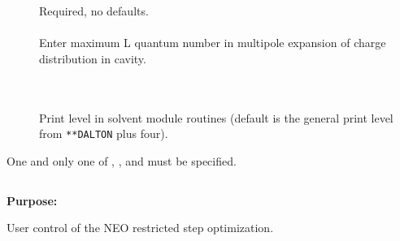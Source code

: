 \begin{description}
\item[]
  Required, no defaults.\\
  \\
  Enter maximum L quantum number in multipole expansion of charge
  distribution in cavity.

\item[] \ \\
   \\
  Print level in solvent module routines
  (default is the general print level from \verb|**DALTON| plus four).
\end{description}


One and only one of ,
, and  must be
specified.



\pagebreak[3]
\subsection{\label{ref-stpinp}}

{\bf Purpose:}

User control of the NEO restricted step optimization.

